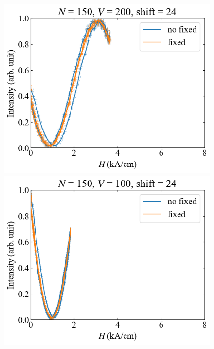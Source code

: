 \documentclass[9pt,dvipdfmx,a4paper]{jsarticle}
\begin{document}
\begin{figure}[H]
    \hfill
    \begin{minipage}[t]{0.24\columnwidth}
        \centering
        \includegraphics[width = \columnwidth]{xy/19.png}
    \end{minipage}
    \hfill
    \begin{minipage}[t]{0.24\columnwidth}
        \centering
        \includegraphics[width = \columnwidth]{xy/20.png}
    \end{minipage}
\end{figure}
\end{document}
